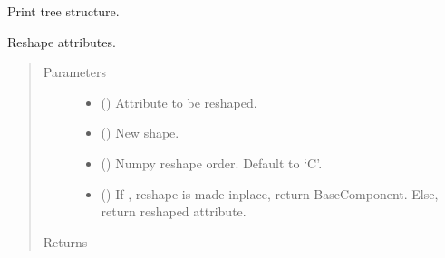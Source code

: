 \documentclass[letterpaper,10pt,english]{sphinxmanual}
\begin{document}
\begin{fulllineitems}
\begin{fulllineitems}
\label{\detokenize{api/wells:geology.src.wells.Wells.render_tree}}
Print tree structure.

\end{fulllineitems}


\begin{fulllineitems}
\label{\detokenize{api/wells:geology.src.wells.Wells.reshape}}
Reshape  attributes.
\begin{quote}\begin{description}
\item[{Parameters}] \leavevmode\begin{itemize}
\item {} 
 (\sphinxstyleliteralemphasis{\sphinxupquote{, }}) \textendash{} Attribute to be reshaped.

\item {} 
 () \textendash{} New shape.

\item {} 
 () \textendash{} Numpy reshape order. Default to ‘C’.

\item {} 
 () \textendash{} If , reshape is made inplace, return BaseComponent.
Else, return reshaped attribute.

\end{itemize}

\item[{Returns}] \leavevmode
{}


\end{description}
\end{quote}
\end{fulllineitems}
\end{fulllineitems}
\end{document}

